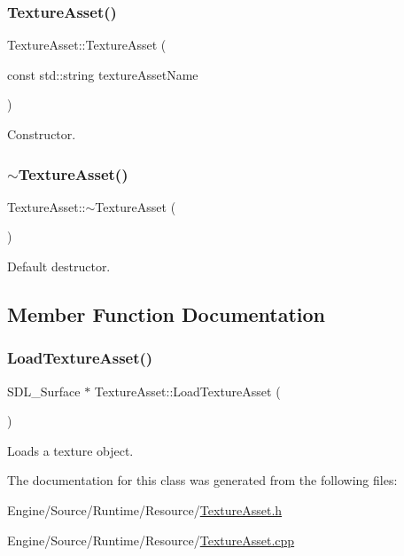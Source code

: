 \subsubsection{\texorpdfstring{Texture\+Asset()}{TextureAsset()}}
{\footnotesize\ttfamily Texture\+Asset\+::\+Texture\+Asset (\begin{DoxyParamCaption}\item[{const std\+::string}]{texture\+Asset\+Name }\end{DoxyParamCaption})}

Constructor. \mbox{\label{class_texture_asset_a115d65cc1ce33a8eb9cc1762497c4537}} 
\subsubsection{\texorpdfstring{$\sim$\+Texture\+Asset()}{~TextureAsset()}}
{\footnotesize\ttfamily Texture\+Asset\+::$\sim$\+Texture\+Asset (\begin{DoxyParamCaption}{ }\end{DoxyParamCaption})}

Default destructor. 

\subsection{Member Function Documentation}
\mbox{\label{class_texture_asset_aef089e5da2cf3bd751e0fad708aa8d8b}} 
\subsubsection{\texorpdfstring{Load\+Texture\+Asset()}{LoadTextureAsset()}}
{\footnotesize\ttfamily S\+D\+L\+\_\+\+Surface $\ast$ Texture\+Asset\+::\+Load\+Texture\+Asset (\begin{DoxyParamCaption}{ }\end{DoxyParamCaption})}

Loads a texture object. 

The documentation for this class was generated from the following files\+:\begin{DoxyCompactItemize}
\item 
Engine/\+Source/\+Runtime/\+Resource/\mbox{\hyperlink{_texture_asset_8h}{Texture\+Asset.\+h}}\item 
Engine/\+Source/\+Runtime/\+Resource/\mbox{\hyperlink{_texture_asset_8cpp}{Texture\+Asset.\+cpp}}\end{DoxyCompactItemize}
